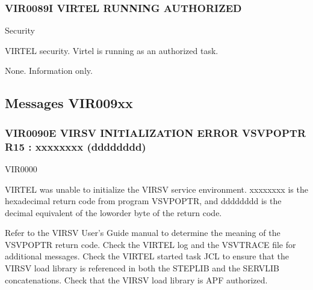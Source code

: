 \documentclass[letterpaper,10pt,english]{sphinxmanual}
\begin{document}
\subsubsection{VIR0089I VIRTEL RUNNING AUTHORIZED}
\label{\detokenize{messages:vir0089i-virtel-running-authorized}}\begin{description}
\sphinxAtStartPar
Security

\sphinxAtStartPar
VIRTEL security. Virtel is running as an authorized task.

\sphinxAtStartPar
None. Information only.

\end{description}


\subsection{Messages VIR009xx}
\label{\detokenize{messages:messages-vir009xx}}

\subsubsection{VIR0090E VIRSV INITIALIZATION ERROR \sphinxhyphen{}VSVPOPTR R15 : xxxxxxxx (dddddddd)}
\label{\detokenize{messages:vir0090e-virsv-initialization-error-vsvpoptr-r15-xxxxxxxx-dddddddd}}\begin{description}
\sphinxAtStartPar
VIR0000

\sphinxAtStartPar
VIRTEL was unable to initialize the VIRSV service environment. xxxxxxxx is the hexadecimal return code from program VSVPOPTR, and dddddddd is the decimal equivalent of the low\sphinxhyphen{}order byte of the return code.

\sphinxAtStartPar
Refer to the VIRSV User’s Guide manual to determine the meaning of the VSVPOPTR return code. Check the VIRTEL log and the VSVTRACE file for additional messages. Check the VIRTEL started task JCL to ensure that the VIRSV load library is referenced in both the STEPLIB and the SERVLIB concatenations. Check that the VIRSV load library is APF\sphinxhyphen{} authorized.

\end{description}
\end{document}
